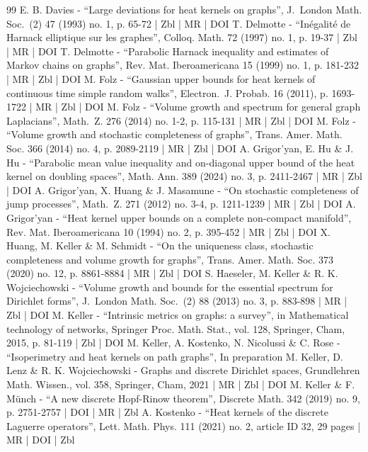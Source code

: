\documentclass[10pt]{amsart}
\theoremstyle{plain}
\theoremstyle{definition}
\begin{document}
\begin{thebibliography}{99}
E. B. Davies - “Large deviations for heat kernels on graphs”, J. London Math. Soc. (2) 47 (1993) no. 1, p. 65-72 | Zbl | MR | DOI
T. Delmotte - “Inégalité de Harnack elliptique sur les graphes”, Colloq. Math. 72 (1997) no. 1, p. 19-37 | Zbl | MR | DOI
T. Delmotte - “Parabolic Harnack inequality and estimates of Markov chains on graphs”, Rev. Mat. Iberoamericana 15 (1999) no. 1, p. 181-232 | MR | Zbl | DOI
M. Folz - “Gaussian upper bounds for heat kernels of continuous time simple random walks”, Electron. J. Probab. 16 (2011), p. 1693-1722 | MR | Zbl | DOI
M. Folz - “Volume growth and spectrum for general graph Laplacians”, Math. Z. 276 (2014) no. 1-2, p. 115-131 | MR | Zbl | DOI
M. Folz - “Volume growth and stochastic completeness of graphs”, Trans. Amer. Math. Soc. 366 (2014) no. 4, p. 2089-2119 | MR | Zbl | DOI
A. Grigor’yan, E. Hu \& J. Hu - “Parabolic mean value inequality and on-diagonal upper bound of the heat kernel on doubling spaces”, Math. Ann. 389 (2024) no. 3, p. 2411-2467 | MR | Zbl | DOI
A. Grigor’yan, X. Huang \& J. Masamune - “On stochastic completeness of jump processes”, Math. Z. 271 (2012) no. 3-4, p. 1211-1239 | MR | Zbl | DOI
A. Grigor’yan - “Heat kernel upper bounds on a complete non-compact manifold”, Rev. Mat. Iberoamericana 10 (1994) no. 2, p. 395-452 | MR | Zbl | DOI
X. Huang, M. Keller \& M. Schmidt - “On the uniqueness class, stochastic completeness and volume growth for graphs”, Trans. Amer. Math. Soc. 373 (2020) no. 12, p. 8861-8884 | MR | Zbl | DOI
S. Haeseler, M. Keller \& R. K. Wojciechowski - “Volume growth and bounds for the essential spectrum for Dirichlet forms”, J. London Math. Soc. (2) 88 (2013) no. 3, p. 883-898 | MR | Zbl | DOI
M. Keller - “Intrinsic metrics on graphs: a survey”, in Mathematical technology of networks, Springer Proc. Math. Stat., vol. 128, Springer, Cham, 2015, p. 81-119 | Zbl | DOI
M. Keller, A. Kostenko, N. Nicolussi \& C. Rose - “Isoperimetry and heat kernels on path graphs”, In preparation
M. Keller, D. Lenz \& R. K. Wojciechowski - Graphs and discrete Dirichlet spaces, Grundlehren Math. Wissen., vol. 358, Springer, Cham, 2021 | MR | Zbl | DOI
M. Keller \& F. Münch - “A new discrete Hopf-Rinow theorem”, Discrete Math. 342 (2019) no. 9, p. 2751-2757 | DOI | MR | Zbl
A. Kostenko - “Heat kernels of the discrete Laguerre operators”, Lett. Math. Phys. 111 (2021) no. 2, article ID 32, 29 pages | MR | DOI | Zbl

\end{thebibliography}
\end{document}
